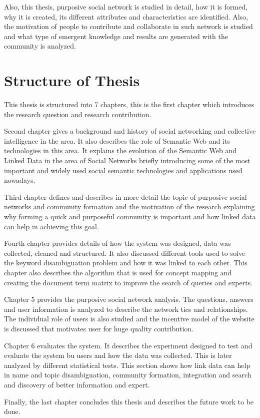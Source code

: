 Also, this thesis, purposive social network is studied in detail, how it is formed, why it is created, its different attributes and characteristics are identified. Also, the motivation of people to contribute and collaborate in such network is studied and what type of emergent knowledge and results are generated with the community is analyzed.


\section{Structure of Thesis}

This thesis is structured into 7 chapters, this is the first chapter which introduces the research question and research contribution.

Second chapter gives a background and history of social networking and collective intelligence in the area. It also describes the role of Semantic Web and its technologies in this area. It explains the evolution of the Semantic Web and Linked Data in the area of Social Networks briefly introducing some of the most important and widely used social semantic technologies and applications used nowadays.

Third chapter defines and describes in more detail the topic of purposive social networks and community formation and the motivation of the research explaining why forming a quick and purposeful community is important and how linked data can help in achieving this goal.

Fourth chapter provides details of how the system was designed, data was collected, cleaned and structured. It also discussed different tools used to solve the keyword disambiguation problem and how it was linked to each other. This chapter also describes the algorithm that is used for concept mapping and creating the document term matrix to improve the search of queries and experts.


Chapter 5 provides the purposive social network analysis. The questions, answers and user information is analyzed to describe the network ties and relationships. The individual role of users is also studied and the incentive model of the website is discussed that motivates user for huge quality contribution.

Chapter 6 evaluates the system. It describes the experiment designed to test and evaluate the system bu users and how the data was collected. This is later analyzed by different statistical tests. This section shows how link data can help in name and topic disambiguation, community formation, integration and search and discovery of better information and expert.

Finally, the last chapter concludes this thesis and describes the future work to be done.